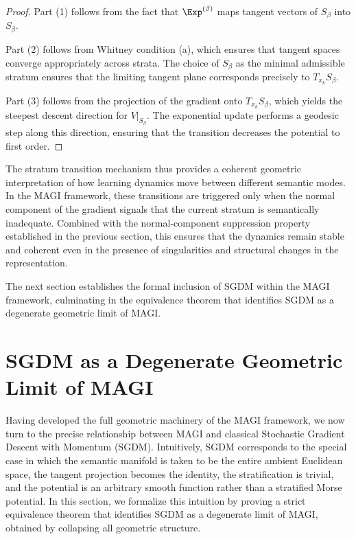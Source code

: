 \documentclass[12pt]{article}
\begin{document}
\begin{proof}
Part (1) follows from the fact that $\Exp^{(\beta)}$ maps tangent vectors of $S_\beta$ into $S_\beta$.

Part (2) follows from Whitney condition (a), which ensures that tangent spaces converge appropriately across strata. The choice of $S_\beta$ as the minimal admissible stratum ensures that the limiting tangent plane corresponds precisely to $T_{x_k}S_\beta$.

Part (3) follows from the projection of the gradient onto $T_{x_k}S_\beta$, which yields the steepest descent direction for $V|_{S_\beta}$. The exponential update performs a geodesic step along this direction, ensuring that the transition decreases the potential to first order.
\end{proof}

The stratum transition mechanism thus provides a coherent geometric interpretation of how learning dynamics move between different semantic modes. In the MAGI framework, these transitions are triggered only when the normal component of the gradient signals that the current stratum is semantically inadequate. Combined with the normal-component suppression property established in the previous section, this ensures that the dynamics remain stable and coherent even in the presence of singularities and structural changes in the representation.

The next section establishes the formal inclusion of SGDM within the MAGI framework, culminating in the equivalence theorem that identifies SGDM as a degenerate geometric limit of MAGI.

\section{SGDM as a Degenerate Geometric Limit of MAGI}

Having developed the full geometric machinery of the MAGI framework, we now turn to the precise relationship between MAGI and classical Stochastic Gradient Descent with Momentum (SGDM). Intuitively, SGDM corresponds to the special case in which the semantic manifold is taken to be the entire ambient Euclidean space, the tangent projection becomes the identity, the stratification is trivial, and the potential is an arbitrary smooth function rather than a stratified Morse potential. In this section, we formalize this intuition by proving a strict equivalence theorem that identifies SGDM as a degenerate limit of MAGI, obtained by collapsing all geometric structure.
\end{document}
